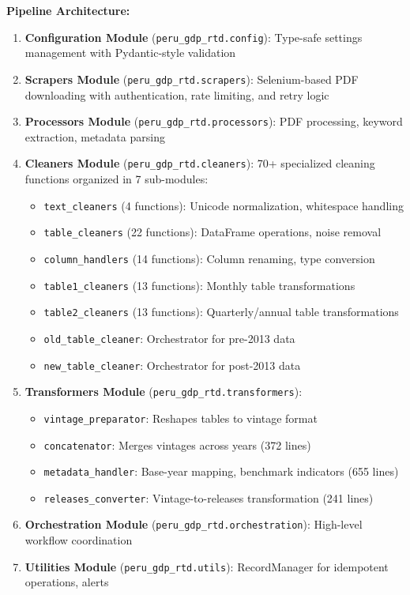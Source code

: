 \documentclass[12pt]{article}
\begin{document}
\textbf{Pipeline Architecture:}
\begin{enumerate}
\item \textbf{Configuration Module} (\texttt{peru\_gdp\_rtd.config}): Type-safe settings management with Pydantic-style validation

\item \textbf{Scrapers Module} (\texttt{peru\_gdp\_rtd.scrapers}): Selenium-based PDF downloading with authentication, rate limiting, and retry logic

\item \textbf{Processors Module} (\texttt{peru\_gdp\_rtd.processors}): PDF processing, keyword extraction, metadata parsing

\item \textbf{Cleaners Module} (\texttt{peru\_gdp\_rtd.cleaners}): 70+ specialized cleaning functions organized in 7 sub-modules:
\begin{itemize}
\item \texttt{text\_cleaners} (4 functions): Unicode normalization, whitespace handling
\item \texttt{table\_cleaners} (22 functions): DataFrame operations, noise removal
\item \texttt{column\_handlers} (14 functions): Column renaming, type conversion
\item \texttt{table1\_cleaners} (13 functions): Monthly table transformations
\item \texttt{table2\_cleaners} (13 functions): Quarterly/annual table transformations
\item \texttt{old\_table\_cleaner}: Orchestrator for pre-2013 data
\item \texttt{new\_table\_cleaner}: Orchestrator for post-2013 data
\end{itemize}

\item \textbf{Transformers Module} (\texttt{peru\_gdp\_rtd.transformers}):
\begin{itemize}
\item \texttt{vintage\_preparator}: Reshapes tables to vintage format
\item \texttt{concatenator}: Merges vintages across years (372 lines)
\item \texttt{metadata\_handler}: Base-year mapping, benchmark indicators (655 lines)
\item \texttt{releases\_converter}: Vintage-to-releases transformation (241 lines)
\end{itemize}

\item \textbf{Orchestration Module} (\texttt{peru\_gdp\_rtd.orchestration}): High-level workflow coordination

\item \textbf{Utilities Module} (\texttt{peru\_gdp\_rtd.utils}): RecordManager for idempotent operations, alerts
\end{enumerate}
\end{document}

